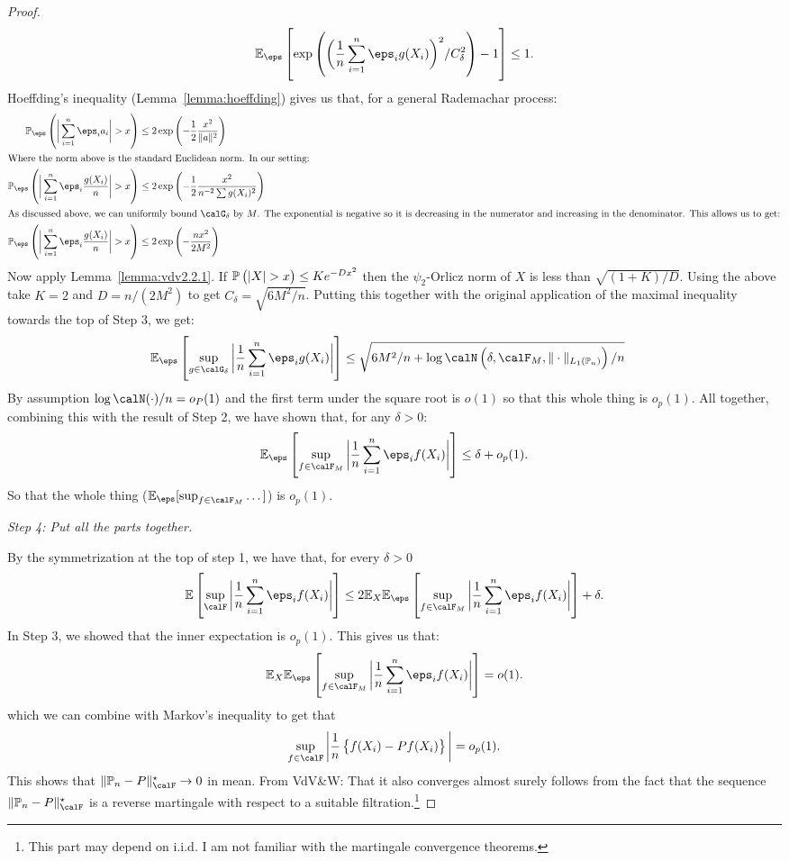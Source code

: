 \begin{proof}
	 \[
		 \E_\eps\left[\exp\left(\bigg(\frac{1}{n}\sum_{i=1}^n \eps_ig(X_i)\bigg)^2/C_\delta^2\right)-1\right]\leq 1
	.\] 
	Hoeffding's inequality (Lemma~\ref{lemma:hoeffding}) gives us that, for a general Rademachar process:
	\begin{align*}
		\P_\eps\left(\bigg|\sum_{i=1}^n \eps_ia_i\bigg|>x\right) &\leq 2\exp\left(-\frac{1}{2}\frac{x^2}{\|a\|^2}\right)\\
		\intertext{Where the norm above is the standard Euclidean norm. In our setting:}
		\P_\eps\left(\bigg|\sum_{i=1}^n \eps_i\frac{g(X_i)}{n} \bigg| > x\right) &\leq 2\exp\left(-\frac{1}{2}\frac{x^2}{n^{-2}\sum g(X_i)^2} \right)\\
		\intertext{As discussed above, we can uniformly bound  \(\calG_\delta\) by  \(M\). The exponential is negative so it is decreasing in the numerator and increasing in the denominator. This allows us to get:} 
		\P_\eps\left(\bigg|\sum_{i=1}^n \eps_i\frac{g(X_i)}{n} \bigg| > x\right) &\leq 2\exp\left(-\frac{n x^2}{2M^2} \right)
	\end{align*}
	Now apply Lemma~\ref{lemma:vdv2.2.1}. If \(\P\left(|X|>x\right)\leq Ke^{-Dx^2}\) then the \(\psi_2\)-Orlicz norm of \(X\) is less than  \(\sqrt{(1+K)/D}\). Using the above take \(K=2\) and \(D = n/(2M^2)\) to get \(C_\delta = \sqrt{6M^2/n}\). Putting this together with the original application of the maximal inequality towards the top of Step 3, we get:
	\begin{align*}
		\E_\eps\left[\sup_{g\in\calG_\delta}\bigg|\frac{1}{n}\sum_{i=1}^n \eps_ig(X_i)\bigg|\right]&\leq \sqrt{6M^2/n + \log\calN\left(\delta,\calF_M,\|\cdot\|_{L_1(\P_n)}\right)/n}
	\end{align*}
	By assumption \(\log\calN(\cdot)/n = o_P(1)\) and the first term under the square root is \(o(1)\) so that this whole thing is \(o_p(1)\). All together, combining this with the result of Step 2, we have shown that, for any \(\delta > 0\):
	\[
		\E_\eps\left[\sup_{f\in\calF_M}\bigg|\frac{1}{n}\sum_{i=1}^n \eps_if(X_i)\bigg|\right] \leq \delta + o_p(1) 
	.\] 
	So that the whole thing (\(\E_\eps[\sup_{f\in\calF_M}\dots]\)) is \(o_p(1)\). 

	\textit{Step 4: Put all the parts together.}
	
	By the symmetrization at the top of step 1, we have that, for every \(\delta > 0\)
	 \[
		 \E\left[\sup_{\calF}\bigg|\frac{1}{n}\sum_{i=1}^n \eps_if(X_i) \bigg|\right] \leq  2\E_X\E_\eps\left[\sup_{f\in\calF_M}\bigg|\frac{1}{n}\sum_{i=1}^n \eps_if(X_i)\bigg|\right] + \delta 
	.\] 
	In Step 3, we showed that the inner expectation is \(o_p(1)\). This gives us that:
	\[
		\E_X\E_\eps\left[\sup_{f\in\calF_M}\bigg|\frac{1}{n}\sum_{i=1}^n \eps_if(X_i)\bigg|\right] = o(1)
	.\] 
	which we can combine with Markov's  inequality to get that
	\[
		\sup_{f\in\calF}\bigg|\frac{1}{n}\left\{f(X_i) - Pf(X_i)\right\}\bigg| = o_p(1)
	.\]
	This shows that \(\|\P_n-P\|_\calF^\star \to 0\) in mean. From VdV\&W: That it also converges almost surely follows from the fact that the sequence \(\|\P_n-P\|_\calF^\star\) is a reverse martingale with respect to a suitable filtration.\footnote{This part may depend on i.i.d. I am not familiar with the martingale convergence theorems.}  
\end{proof}

